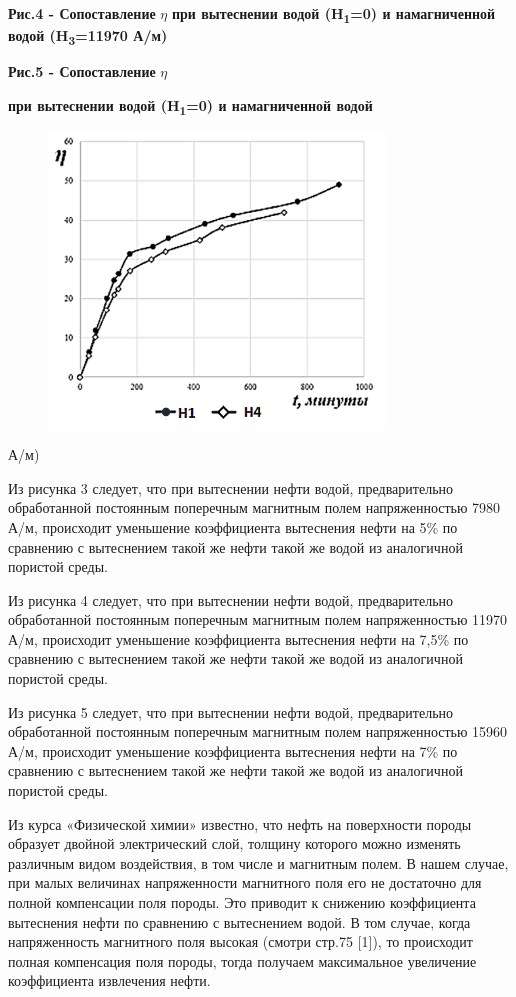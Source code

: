 {{{\bfseries Рис.4 - Сопоставление} \(\eta\) {\bfseries при вытеснении водой
(H\textsubscript{1}=0) и намагниченной водой (H\textsubscript{3}=11970
А/м)}

{\bfseries Рис.5 - Сопоставление} \(\eta\) {\bfseries при вытеснении водой
(H\textsubscript{1}=0) и намагниченной водой
\begin{figure}[H]
	\centering
	\includegraphics[width=0.8\textwidth]{media/gorn4/image6}
	\caption*{}
\end{figure}

А/м)}

Из рисунка 3 следует, что при вытеснении нефти водой, предварительно
обработанной постоянным поперечным магнитным полем напряженностью 7980
А/м, происходит уменьшение коэффициента вытеснения нефти на 5\% по
сравнению с вытеснением такой же нефти такой же водой из аналогичной
пористой среды.

Из рисунка 4 следует, что при вытеснении нефти водой, предварительно
обработанной постоянным поперечным магнитным полем напряженностью 11970
А/м, происходит уменьшение коэффициента вытеснения нефти на 7,5\% по
сравнению с вытеснением такой же нефти такой же водой из аналогичной
пористой среды.

Из рисунка 5 следует, что при вытеснении нефти водой, предварительно
обработанной постоянным поперечным магнитным полем напряженностью 15960
А/м, происходит уменьшение коэффициента вытеснения нефти на 7\% по
сравнению с вытеснением такой же нефти такой же водой из аналогичной
пористой среды.

Из курса «Физической химии» известно, что нефть на поверхности породы
образует двойной электрический слой, толщину которого можно изменять
различным видом воздействия, в том числе и магнитным полем. В нашем
случае, при малых величинах напряженности магнитного поля его не
достаточно для полной компенсации поля породы. Это приводит к снижению
коэффициента вытеснения нефти по сравнению с вытеснением водой. В том
случае, когда напряженность магнитного поля высокая (смотри стр.75
{[}1{]}), то происходит полная компенсация поля породы, тогда получаем
максимальное увеличение коэффициента извлечения нефти.

}}
